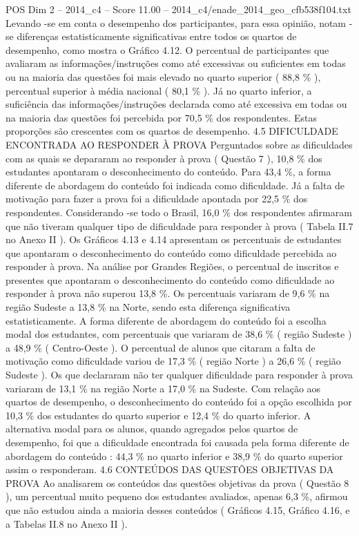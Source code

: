 \begin{textsample}{POS Dim 2 – 2014\_c4 – Score 11.00 – 2014\_c4/enade\_2014\_geo\_cfb538f104.txt}
Levando -se em conta o desempenho dos participantes, para essa opinião, notam -se diferenças estatisticamente significativas entre todos os quartos de desempenho, como mostra o Gráfico 4.12.
O percentual de participantes que avaliaram as informações/instruções como até excessivas ou suficientes em todas ou na maioria das questões foi mais elevado no quarto superior ( 88,8 \% ), percentual superior à média nacional ( 80,1 \% ).
Já no quarto inferior, a suficiência das informações/instruções declarada como até excessiva em todas ou na maioria das questões foi percebida por 70,5 \% dos respondentes.
Estas proporções são crescentes com os quartos de desempenho. 4.5 DIFICULDADE ENCONTRADA AO RESPONDER À PROVA Perguntados sobre as dificuldades com as quais se depararam ao responder à prova ( Questão 7 ), 10,8 \% dos estudantes apontaram o desconhecimento do conteúdo.
Para 43,4 \%, a forma diferente de abordagem do conteúdo foi indicada como dificuldade.
Já a falta de motivação para fazer a prova foi a dificuldade apontada por 22,5 \% dos respondentes.
Considerando -se todo o Brasil, 16,0 \% dos respondentes afirmaram que não tiveram qualquer tipo de dificuldade para responder à prova ( Tabela II.7 no Anexo II ).
Os Gráficos 4.13 e 4.14 apresentam os percentuais de estudantes que apontaram o desconhecimento do conteúdo como dificuldade percebida ao responder à prova.
Na análise por Grandes Regiões, o percentual de inscritos e presentes que apontaram o desconhecimento do conteúdo como dificuldade ao responder à prova não superou 13,8 \%.
Os percentuais variaram de 9,6 \% na região Sudeste a 13,8 \% na Norte, sendo esta diferença significativa estatisticamente.
A forma diferente de abordagem do conteúdo foi a escolha modal dos estudantes, com percentuais que variaram de 38,6 \% ( região Sudeste ) a 48,9 \% ( Centro-Oeste ).
O percentual de alunos que citaram a falta de motivação como dificuldade variou de 17,3 \% ( região Norte ) a 26,6 \% ( região Sudeste ).
Os que declararam não ter qualquer dificuldade para responder à prova variaram de 13,1 \% na região Norte a 17,0 \% na Sudeste.
Com relação aos quartos de desempenho, o desconhecimento do conteúdo foi a opção escolhida por 10,3 \% dos estudantes do quarto superior e 12,4 \% do quarto inferior.
A alternativa modal para os alunos, quando agregados pelos quartos de desempenho, foi que a dificuldade encontrada foi causada pela forma diferente de abordagem do conteúdo : 44,3 \% no quarto inferior e 38,9 \% do quarto superior assim o responderam. 4.6 CONTEÚDOS DAS QUESTÕES OBJETIVAS DA PROVA Ao analisarem os conteúdos das questões objetivas da prova ( Questão 8 ), um percentual muito pequeno dos estudantes avaliados, apenas 6,3 \%, afirmou que não estudou ainda a maioria desses conteúdos ( Gráficos 4.15, Gráfico 4.16, e a Tabelas II.8 no Anexo II ).

\end{textsample}
